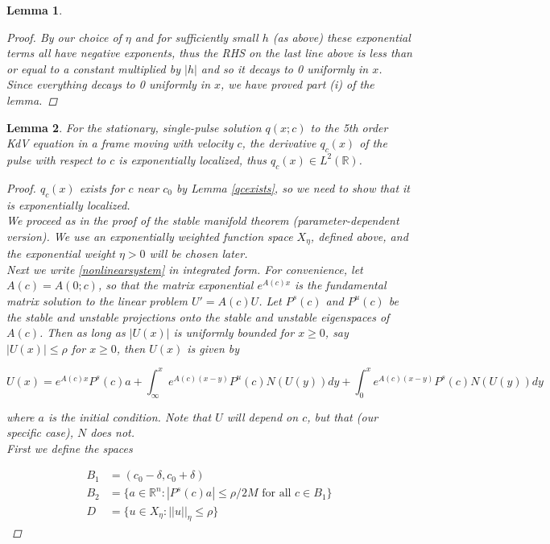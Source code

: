 \documentclass[12pt]{article}
\def\R{{\mathbb R}}
\newtheorem{lemma}{Lemma}
\begin{document}
\begin{lemma}
\begin{proof}
By our choice of $\eta$ and for sufficiently small $h$ (as above) these exponential terms all have negative exponents, thus the RHS on the last line above is less than or equal to a constant multiplied by $|h|$ and so it decays to 0 uniformly in $x$.\\

Since everything decays to 0 uniformly in $x$, we have proved part (i) of the lemma.

\end{proof}
\end{lemma}


\begin{lemma}\label{qc}
For the stationary, single-pulse solution $q(x; c)$ to the 5th order KdV equation in a frame moving with velocity $c$, the derivative $q_c(x)$ of the pulse with respect to $c$ is exponentially localized, thus $q_c(x) \in L^2(\R)$.
\begin{proof}
$q_c(x)$ exists for $c$ near $c_0$ by Lemma \ref{qcexists}, so we need to show that it is exponentially localized.\\

We proceed as in the proof of the stable manifold theorem (parameter-dependent version). We use an exponentially weighted function space $X_\eta$, defined above, and the exponential weight $\eta > 0$ will be chosen later.\\

Next we write \eqref{nonlinearsystem} in integrated form. For convenience, let $A(c) = A(0; c)$, so that the matrix exponential $e^{A(c)x}$ is the fundamental matrix solution to the linear problem $U' = A(c) U$. Let $P^s(c)$ and $P^u(c)$ be the stable and unstable projections onto the stable and unstable eigenspaces of $A(c)$. Then as long as $|U(x)|$ is uniformly bounded for $x \geq 0$, say $|U(x)| \leq \rho$ for $x \geq 0$, then $U(x)$ is given by

\[
U(x) = e^{A(c)x} P^s(c) a + \int_\infty^x e^{A(c)(x - y)}P^u(c) N(U(y))dy + \int_0^x e^{A(c)(x - y)}P^s(c) N(U(y))dy
\]

where $a$ is the initial condition. Note that $U$ will depend on $c$, but that (our specific case), $N$ does not.\\

First we define the spaces

\begin{align*}
B_1 &= (c_0 - \delta, c_0 + \delta) \\
B_2 &= \{ a \in \R^n : |P^s(c) a| \leq \rho/2M \text{ for all } c \in B_1\} \\
D &= \{ u \in X_\eta : ||u||_\eta \leq \rho \}
\end{align*}


\end{proof}
\end{lemma}
\end{document}
